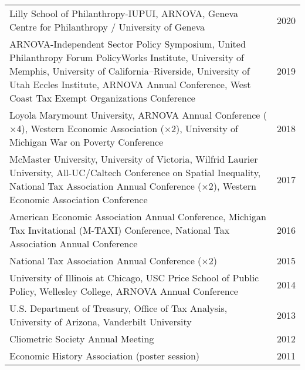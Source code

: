 \documentclass[12pt]{article}
\newlength{\dategap}
\newcommand{\X}{$\times$}		%
\begin{document}
\begin{tabular}[t]{H{0.75\textwidth} R{0.187\textwidth}}

Lilly School of Philanthropy-IUPUI,
ARNOVA,
Geneva Centre for Philanthropy / University of Geneva										
																& 2020 \\ \addlinespace[\dategap]

ARNOVA-Independent Sector Policy Symposium,
United Philanthropy Forum PolicyWorks Institute,
University of Memphis, 
University of California--Riverside,
University of Utah Eccles Institute, ARNOVA Annual Conference, 
West Coast Tax Exempt Organizations Conference
																& 2019 \\ \addlinespace[\dategap]

Loyola Marymount University,
ARNOVA Annual Conference (\X4), 
Western Economic Association (\X2),
University of Michigan War on Poverty Conference 
																& 2018 \\ \addlinespace[\dategap]
McMaster University, 
University of Victoria, 
Wilfrid Laurier University,	
All-UC/Caltech Conference on Spatial Inequality,
National Tax Association Annual Conference (\X2), 
Western Economic Association Conference
																& 2017 \\ \addlinespace[\dategap]
American Economic Association Annual Conference,
	Michigan Tax Invitational (M-TAXI) Conference,
	National Tax Association Annual Conference 
																& 2016 \\ \addlinespace[\dategap]
																						
National Tax Association Annual Conference (\X2)					& 2015 \\ \addlinespace[\dategap]																					

University of Illinois at Chicago,
USC Price School of Public Policy, 
Wellesley College, 
ARNOVA Annual Conference 						
																& 2014 \\ \addlinespace[\dategap]	
																					
U.S. Department of Treasury, Office of Tax Analysis, 
University of Arizona,
Vanderbilt University 												
																& 2013 \\ \addlinespace[\dategap]																												
Cliometric Society Annual Meeting								& 2012 \\ \addlinespace[\dategap]									
Economic History Association (poster session)					& 2011
\end{tabular}

\end{document}
